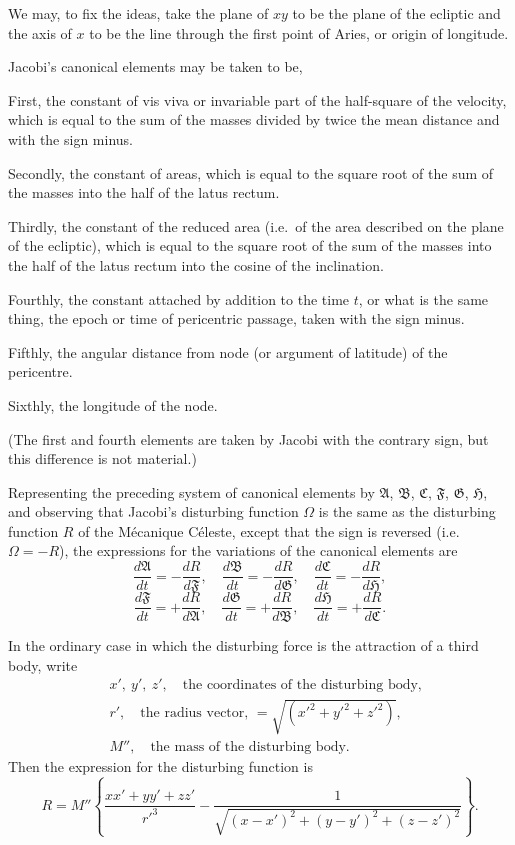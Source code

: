 \documentclass[11pt]{article}
\begin{document}
\medskip

\noindent We may, to fix the ideas, take the plane of $xy$ to be the plane of the ecliptic
and the axis of $x$ to be the line through the first point of Aries, or origin of
longitude.

Jacobi's canonical elements may be taken to be,

First, the constant of vis viva or invariable part of the half-square of the
velocity, which is equal to the sum of the masses divided by twice the mean distance
and with the sign minus.

Secondly, the constant of areas, which is equal to the square root of the sum
of the masses into the half of the latus rectum.

Thirdly, the constant of the reduced area (i.e.\ of the area described on the plane
of the ecliptic), which is equal to the square root of the sum of the masses into the
half of the latus rectum into the cosine of the inclination.

Fourthly, the constant attached by addition to the time $t$, or what is the same
thing, the epoch or time of pericentric passage, taken with the sign minus.

Fifthly, the angular distance from node (or argument of latitude) of the pericentre.

Sixthly, the longitude of the node.

(The first and fourth elements are taken by Jacobi with the contrary sign, but
this difference is not material.)

Representing the preceding system of canonical elements by $\mathfrak{A}$, $\mathfrak{B}$, $\mathfrak{C}$, $\mathfrak{F}$, $\mathfrak{G}$, $\mathfrak{H}$,
and observing that Jacobi's disturbing function $\Omega$ is the same as the disturbing
function $R$ of the M\'ecanique C\'eleste, except that the sign is reversed (i.e.\ $\Omega = - R$),
the expressions for the variations of the canonical elements are
\[
\frac{d\mathfrak{A}}{dt} = - \frac{dR}{d\mathfrak{F}},\quad \frac{d\mathfrak{B}}{dt} = - \frac{dR}{d\mathfrak{G}},\quad \frac{d\mathfrak{C}}{dt} = - \frac{dR}{d\mathfrak{H}},
\]
\[
\frac{d\mathfrak{F}}{dt} = + \frac{dR}{d\mathfrak{A}},\quad \frac{d\mathfrak{G}}{dt} = + \frac{dR}{d\mathfrak{B}},\quad \frac{d\mathfrak{H}}{dt} = + \frac{dR}{d\mathfrak{C}}.
\]

In the ordinary case in which the disturbing force is the attraction of a third
body, write
\begin{align*}
& x',\ y',\ z',\quad\text{the coordinates of the disturbing body,}\\
& r',\quad\text{the radius vector, } = \sqrt{(x'^{2} + y'^{2} + z'^{2})},\\
& M'',\quad\text{the mass of the disturbing body.}
\end{align*}
Then the expression for the disturbing function is
\[
R = M''\left\{\frac{xx' + yy' + zz'}{r'^{3}} - \frac{1}{\sqrt{(x - x')^{2} + (y - y')^{2} + (z - z')^{2}}}\right\}.
\]
\end{document}
